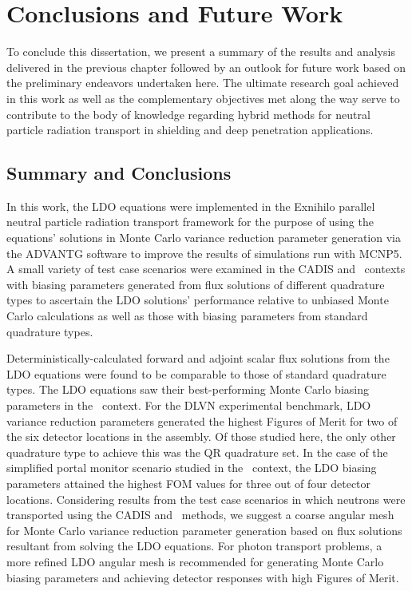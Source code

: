 \chapter{Conclusions and Future Work}
\label{ch:conc}

To conclude this dissertation, we present a summary of the results and analysis delivered in the
previous chapter followed by an outlook for future work based on the preliminary endeavors
undertaken here. The ultimate research goal achieved in this work as well as the complementary 
objectives met along the way serve to contribute to the body of knowledge regarding hybrid methods
for neutral particle radiation transport in shielding and deep penetration applications.

\section{Summary and Conclusions}

In this work, the LDO equations were implemented in the Exnihilo parallel neutral particle 
radiation transport framework for the purpose of using the equations' solutions in Monte Carlo
variance reduction parameter generation via the ADVANTG software to improve the results of
simulations run with MCNP5. A small variety of test case scenarios were examined in the CADIS and
\fwc\ contexts with biasing parameters generated from flux solutions of different quadrature 
types to ascertain the LDO solutions' performance relative to unbiased Monte Carlo calculations 
as well as those with biasing parameters from standard quadrature types.

Deterministically-calculated forward and adjoint scalar flux solutions from the LDO equations 
were found to be comparable to those of standard quadrature types. The LDO equations saw their
best-performing Monte Carlo biasing parameters in the \fwc\ context. For the DLVN experimental
benchmark, LDO variance reduction parameters generated the highest Figures of Merit for two of the
six detector locations in the assembly. Of those studied here, the only other quadrature type to
achieve this was the QR quadrature set. In the case of the simplified portal monitor scenario
studied in the \fwc\ context, the LDO biasing parameters attained the highest FOM values for three
out of four detector locations. Considering results from the test case scenarios in which neutrons
were transported using the CADIS and \fwc\ methods, we suggest a coarse angular mesh for Monte 
Carlo variance reduction parameter generation based on flux solutions resultant from solving the 
LDO equations. For photon transport problems, a more refined LDO angular mesh is recommended for
generating Monte Carlo biasing parameters and achieving detector responses with high Figures of
Merit.

